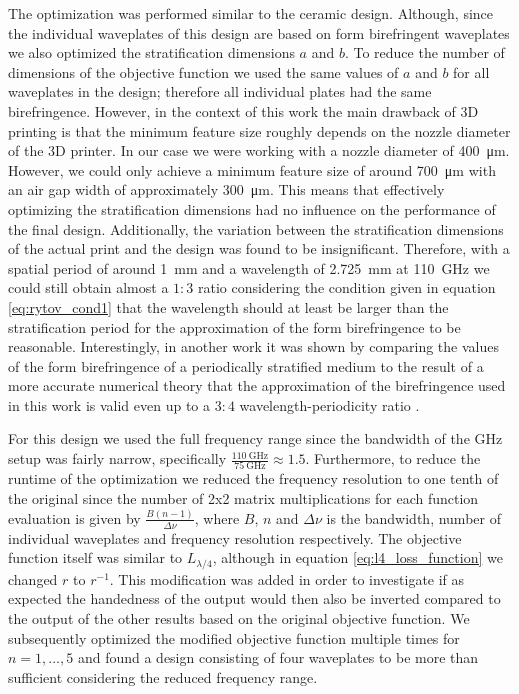 The optimization was performed similar to the ceramic design. Although, since the individual waveplates of this design are based on form birefringent waveplates we also optimized the stratification dimensions $a$ and $b$. To reduce the number of dimensions of the objective function we used the same values of $a$ and $b$ for all waveplates in the design; therefore all individual plates had the same birefringence. However, in the context of this work the main drawback of 3D printing is that the minimum feature size roughly depends on the nozzle diameter of the 3D printer. In our case we were working with a nozzle diameter of \SI{400}{\micro \meter}. However, we could only achieve a minimum feature size of around \SI{700}{\micro \meter} with an air gap width of approximately \SI{300}{\micro \meter}. This means that effectively optimizing the stratification dimensions had no influence on the performance of the final design. Additionally, the variation between the stratification dimensions of the actual print and the design was found to be insignificant. 
Therefore, with a spatial period of around \SI{1}{\milli \meter} and a wavelength of \SI{2.725}{\milli \meter} at \SI{110}{\giga \hertz} we could still obtain almost a $1:3$ ratio considering the condition given in equation \ref{eq:rytov_cond1} that the wavelength should at least be larger than the stratification period for the approximation of the form birefringence to be reasonable. Interestingly, in another work it was shown by comparing the values of the form birefringence of a periodically stratified medium to the result of a more accurate numerical theory that the approximation of the birefringence used in this work is valid even up to a $3:4$ wavelength-periodicity ratio \cite{Busch2016}.

For this design we used the full frequency range since the bandwidth of the GHz setup was fairly narrow, specifically $\frac{\SI{110}{\giga \hertz}}{\SI{75}{\giga \hertz}} \approx 1.5$. Furthermore, to reduce the runtime of the optimization we reduced the frequency resolution to one tenth of the original since the number of 2x2 matrix multiplications for each function evaluation is given by $\frac{B(n-1)}{\Delta \nu}$, where $B$, $n$ and $\Delta \nu$ is the bandwidth, number of individual waveplates and frequency resolution respectively. The objective function itself was similar to $L_{\lambda/4}$, although in equation \ref{eq:l4_loss_function} we changed $r$ to $r^{-1}$. This modification was added in order to investigate if as expected the handedness of the output would then also be inverted compared to the output of the other results based on the original objective function. We subsequently optimized the modified objective function multiple times for $n=1, ..., 5$ and found a design consisting of four waveplates to be more than sufficient considering the reduced frequency range. 

